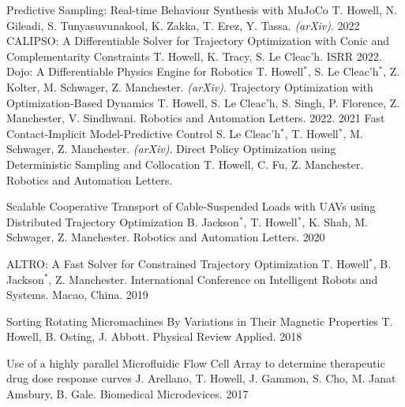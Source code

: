 


\begin{cvhonors}

	\cvhonor
	{Predictive Sampling: Real-time Behaviour Synthesis with MuJoCo} %
	{T. Howell, N. Gileadi, S. Tunyasuvunakool, K. Zakka, T. Erez, Y. Tassa. \textit{(arXiv)}.} %
	{}
	{2022} %
	\cvhonor
	{CALIPSO: A Differentiable Solver for Trajectory Optimization with Conic and Complementarity Constraints} %
	{T. Howell, K. Tracy, S. Le Cleac'h. ISRR 2022.} %
	{}
	{} %
	\cvhonor
	{Dojo: A Differentiable Physics Engine for Robotics} %
	{T. Howell$^*$, S. Le Cleac'h$^*$, Z. Kolter, M. Schwager, Z. Manchester. \textit{(arXiv)}.} %
	{}
	{} %
   \cvhonor
	{Trajectory Optimization with Optimization-Based Dynamics} %
	{T. Howell, S. Le Cleac'h, S. Singh, P. Florence, Z. Manchester, V. Sindhwani. Robotics and Automation Letters. 2022.} %
	{}
	{2021} %
   \cvhonor
	{Fast Contact-Implicit Model-Predictive Control} %
	{S. Le Cleac'h$^*$, T. Howell$^*$, M. Schwager, Z. Manchester. \textit{(arXiv)}.} %
	{}
	{} %
  \cvhonor
    {Direct Policy Optimization using Deterministic Sampling and Collocation} %
    {T. Howell, C. Fu, Z. Manchester. Robotics and Automation Letters.} %
    {}
    {} %
    
  \cvhonor
    {Scalable Cooperative Transport of Cable-Suspended Loads with UAVs using Distributed Trajectory Optimization} %
    {B. Jackson$^*$, T. Howell$^*$, K. Shah, M. Schwager, Z. Manchester. Robotics and Automation Letters.} %
    {}
    {2020} %
    
  \cvhonor
    {ALTRO: A Fast Solver for Constrained Trajectory Optimization}
    {T. Howell$^*$, B. Jackson$^*$, Z. Manchester. International Conference on Intelligent Robots and Systems. Macao, China.}
    {}
    {2019}
    
  \cvhonor
    {Sorting Rotating Micromachines By Variations in Their Magnetic Properties}
    {T. Howell, B. Osting, J. Abbott. Physical Review Applied.} 
    {}
    {2018}
    
  \cvhonor
    {Use of a highly parallel Microfluidic Flow Cell Array to determine therapeutic drug dose response curves}
    {J. Arellano, T. Howell, J. Gammon, S. Cho, M. Janat Amsbury, B. Gale. Biomedical Microdevices.}
    {}
    {2017}
    
\end{cvhonors}
